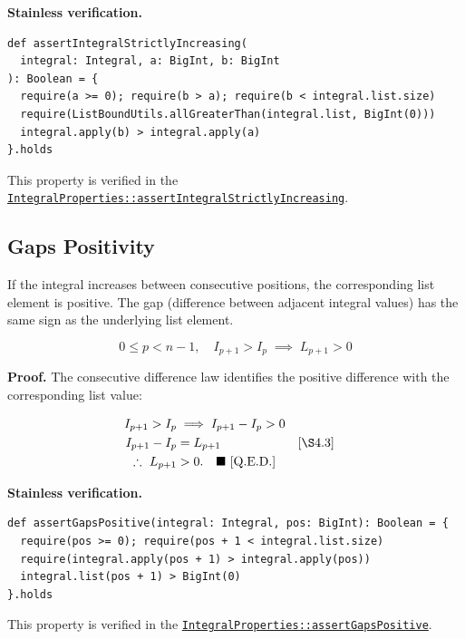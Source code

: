 \textbf{Stainless verification.}

\begin{lstlisting}[style=scala]
def assertIntegralStrictlyIncreasing(
  integral: Integral, a: BigInt, b: BigInt
): Boolean = {
  require(a >= 0); require(b > a); require(b < integral.list.size)
  require(ListBoundUtils.allGreaterThan(integral.list, BigInt(0)))
  integral.apply(b) > integral.apply(a)
}.holds
\end{lstlisting}

{\raggedright
This property is verified in the
\href{https://github.com/thiagomata/prime-numbers/blob/master/src/main/scala/v1/chapter3/list/integral/properties/IntegralProperties.scala}{\texttt{IntegralProperties::\allowbreak assertIntegralStrictlyIncreasing}}.
\par}

\subsection{Gaps Positivity}
\label{sec:gaps-positivity}

If the integral increases between consecutive positions, the corresponding
list element is positive. The gap (difference between adjacent integral
values) has the same sign as the underlying list element.

\begin{equation*}
0 \leq p < n-1,\quad I_{p+1} > I_p \;\implies\; L_{p+1} > 0
\end{equation*}

\textbf{Proof.} The consecutive difference law identifies the positive
difference with the corresponding list value:

\begin{equation*}
\begin{aligned}
I_{p+1}>I_p &\implies I_{p+1}-I_p>0 \\
I_{p+1}-I_p &= L_{p+1} &&\text{[\S4.3]} \\
\therefore\ L_{p+1} &> 0.
  \quad \blacksquare\ \text{[Q.E.D.]}
\end{aligned}
\end{equation*}

\textbf{Stainless verification.}

\begin{lstlisting}[style=scala]
def assertGapsPositive(integral: Integral, pos: BigInt): Boolean = {
  require(pos >= 0); require(pos + 1 < integral.list.size)
  require(integral.apply(pos + 1) > integral.apply(pos))
  integral.list(pos + 1) > BigInt(0)
}.holds
\end{lstlisting}

{\raggedright
This property is verified in the
\href{https://github.com/thiagomata/prime-numbers/blob/master/src/main/scala/v1/chapter3/list/integral/properties/IntegralProperties.scala}{\texttt{IntegralProperties::\allowbreak assertGapsPositive}}.
\par}
